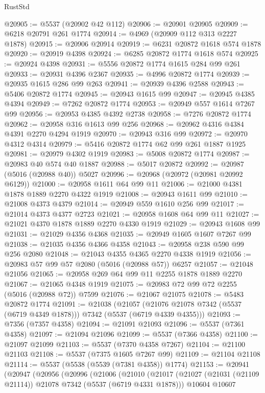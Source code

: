 \begin{lexlean}{RustStd}
\begin{coremodule}
@20905 := @5537 (@20902 @42 @112)
@20906 := @20901 @20905
@20909 := @6218 @20791 @261 @1774
@20914 := @4969 (@20909 @112 @313 @2227 @1878)
@20915 := @20906 @20914
@20919 := @6231 @20872 @1618 @574 @1878
@20920 := @20919 @4398
@20924 := @6285 @20872 @1774 @1618 @574
@20925 := @20924 @4398
@20931 := @5556 @20872 @1774 @1615 @284 @99 @261
@20933 := @20931 @4396 @2367
@20935 := @4996 @20872 @1774
@20939 := @20935 @1615 @286 @99 @263
@20941 := @20939 @4396 @2588
@20943 := @5406 @20872 @1774
@20945 := @20943 @1615 @99
@20947 := @20945 @4385 @4394
@20949 := @7262 @20872 @1774
@20953 := @20949 @557 @1614 @7267 @99
@20956 := @20953 @4385 @4392 @2738
@20958 := @7276 @20872 @1774
@20962 := @20958 @316 @1613 @99 @256
@20968 := @20962 @4316 @4384 @4391 @2270 @4294 @1919
@20970 := @20943 @316 @99
@20972 := @20970 @4312 @4314
@20979 := @5416 @20872 @1774 @62 @99 @261 @1887 @1925
@20981 := @20979 @4302 @1919
@20983 := @5008 @20872 @1774
@20987 := @20983 @40 @574 @40 @1887
@20988 := @5017 @20872
@20992 := @20987 (@5016 (@20988 @40)) @5027
@20996 := @20968 (@20972 (@20981 @20992 @6129))
@21000 := @20958 @1611 @64 @99 @11
@21006 := @21000 @4381 @1878 @1889 @2270 @4322 @1919
@21008 := @20943 @1611 @99
@21010 := @21008 @4373 @4379
@21014 := @20949 @559 @1610 @256 @99
@21017 := @21014 @4373 @4377 @2723
@21021 := @20958 @1608 @64 @99 @11
@21027 := @21021 @4370 @1878 @1889 @2270 @4330 @1919
@21029 := @20943 @1608 @99
@21031 := @21029 @4356 @4368
@21035 := @20949 @1605 @1607 @7267 @99
@21038 := @21035 @4356 @4366 @4358
@21043 := @20958 @238 @590 @99 @256 @2080
@21048 := @21043 @4355 @4365 @2270 @4338 @1919
@21056 := @20983 @57 @99 @57 @2080 (@5016 (@20988 @57)) @6257
@21057 := @21048 @21056
@21065 := @20958 @269 @64 @99 @11 @2255 @1878 @1889 @2270
@21067 := @21065 @4348 @1919
@21075 := @20983 @72 @99 @72 @2255 (@5016 (@20988 @72)) @7599
@21076 := @21067 @21075
@21078 := @5483 @20872 @1774
@21091 := @21038
    (@21057 (@21076 @21078 @7342 (@5537 (@6719 @4349 @1878))) @7342 (@5537 (@6719 @4339 @4355)))
@21093 := @7356 (@7357 @4358)
@21094 := @21091 @21093
@21096 := @5537 (@7361 @4358)
@21097 := @21094 @21096
@21099 := @5537 (@7366 @4358)
@21100 := @21097 @21099
@21103 := @5537 (@7370 @4358 @7267)
@21104 := @21100 @21103
@21108 := @5537 (@7375 @1605 @7267 @99)
@21109 := @21104 @21108
@21114 := @5537 (@5538 (@5539 (@7381 @4358)) @1774)
@21153 := @20941
    (@20947
      (@20956
        (@20996
          (@21006
            (@21010
              (@21017
                (@21027 (@21031 (@21109 @21114)) @21078 @7342 (@5537 (@6719 @4331 @1878)))
                @10604
                @10607

\end{coremodule}
\end{lexlean}
